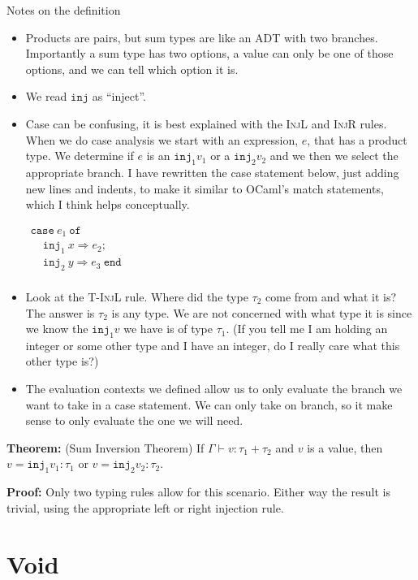 \documentclass{lecturenotes}
\newcommand{\Tt}[1]{\texttt{#1}}
\begin{document}
\noindent Notes on the definition
\begin{itemize}
  \item Products are pairs, but sum types are like an ADT with two branches. 
    Importantly a sum type has two options, a value can only be one of those options, and we can tell which option it is. 
  \item We read $\Tt{inj}$ as ``inject''.
  \item Case can be confusing, it is best explained with the \textsc{InjL} and \textsc{InjR} rules. 
    When we do case analysis we start with an expression, $e$, that has a product type. 
    We determine if $e$ is an $\Tt{inj}_1v_1$ or a $\Tt{inj}_2v_2$ and we then we select the appropriate branch. I have rewritten the case statement below, just adding new lines and indents, to make it similar to OCaml's match statements, which I think helps conceptually. 

    $
    \begin{array}{l}
         \Tt{case}~e_1~\Tt{of} \\ 
         ~~~~~\Tt{inj}_1~x \Rightarrow e_2; \\
         ~~~~~\Tt{inj}_2~y \Rightarrow e_3 ~\Tt{end} \\
    \end{array}
    $

  \item Look at the \textsc{T-InjL} rule. Where did the type $\tau_2$ come from and what it is?
    The answer is $\tau_2$ is any type. 
    We are not concerned with what type it is since we know the $\Tt{inj}_1v$ we have is of type $\tau_1$. (If you tell me I am holding an integer or some other type and I have an integer, do I really care what this other type is?)
  \item The evaluation contexts we defined allow us to only evaluate the branch we want to take in a case statement. 
    We can only take on branch, so it make sense to only evaluate the one we will need. 
\end{itemize}

\noindent \textbf{Theorem:} (Sum Inversion Theorem) If $\Gamma \vdash v : \tau_1 + \tau_2$ and $v$ is a value, then $v = \Tt{inj}_1v_1 : \tau_1$ or $v = \Tt{inj}_2v_2 : \tau_2$.

\noindent \textbf{Proof:} Only two typing rules allow for this scenario. 
  Either way the result is trivial, using the appropriate left or right injection rule. 

\section{Void}
\end{document}

